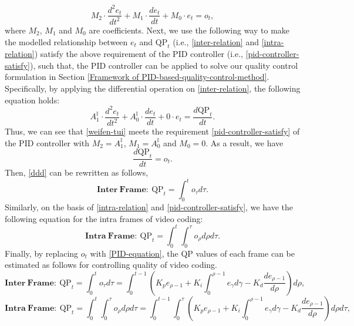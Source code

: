 \documentclass[smallabstract,smallcaptions]{dccpaper}
\begin{document}
\begin{equation}
\label{pid-controller-satisfy}
M_2 \cdot \frac{d^2e_t}{dt^2} + M_1 \cdot \frac{de_t}{dt} + M_0 \cdot e_t = o_t,
\end{equation}
where $M_2$, $M_1$ and $M_0$ are coefficients. Next, we use the following way to make the modelled relationship between $e_t$ and $\mathrm{QP}_{t}$ (i.e., \eqref{inter-relation} and \eqref{intra-relation}) satisfy the above requirement of the PID controller (i.e., \eqref{pid-controller-satisfy}), such that, the PID controller can be applied to solve our quality control formulation in Section \ref{Framework of PID-based-quality-control-method}. Specifically, by applying the differential operation on \eqref{inter-relation}, the following equation holds:
\begin{equation}
\label{weifen-tui}
A_1^\mathbb{I} \cdot \frac{d^2e_t}{dt^2} + A_0^\mathbb{I} \cdot \frac{de_t}{dt} +0 \cdot e_t= \frac{d\mathrm{QP}_t}{dt}.
\end{equation}
Thus, we can see that \eqref{weifen-tui} meets the requirement \eqref{pid-controller-satisfy} of the PID controller with $M_2=A_1^\mathbb{I}$, $M_1=A_0^\mathbb{I}$ and $M_0=0$. As a result, we have
\begin{equation}
\label{ddd}
\frac{d\mathrm{QP}_t}{dt}=o_t.
\end{equation}
Then, \eqref{ddd} can be rewritten as follows,
\begin{equation}
\mathbf{Inter~Frame:~}\mathrm{QP}_{t}=\int^t_0 o_\tau d\tau.
\end{equation}
Similarly, on the basis of \eqref{intra-relation} and \eqref{pid-controller-satisfy}, we have the following equation for the intra frames of video coding:
\begin{equation}
\mathbf{Intra~Frame:~}\mathrm{QP}_{t}=\int_0^{t}\int_0^{\tau} o_\rho d{\rho}d{\tau}.
\end{equation}
Finally, by replacing $o_t$ with \eqref{PID-equation}, the $\mathrm{QP}$ values of each frame can be estimated as follows for controlling quality of video coding.
\begin{equation}
\label{final-policy-function-inter}
\mathbf{Inter~Frame:~}\mathrm{QP}_{t}=\int_0^{t} o_\tau d{\tau}=\int_0^{t-1}(K_pe_{\rho-1}+K_i\int^{\rho-1}_0e_{\gamma}d\gamma-K_d\dfrac{de_{\rho-1}}{d{\rho}})d{\rho},
\end{equation}
\begin{equation}
\label{final-policy-function-intra}
\mathbf{Intra~Frame:~}\mathrm{QP}_{t}=\int_0^{t}\int_0^{\tau} o_\rho d{\rho}d{\tau} =\int_0^{t-1}\int_0^{\tau}(K_pe_{\rho-1}+K_i\int^{\rho-1}_0e_{\gamma}d\gamma-K_d\dfrac{de_{\rho-1}}{d{\rho}})d{\rho}d{\tau},
\end{equation}
\end{document}
